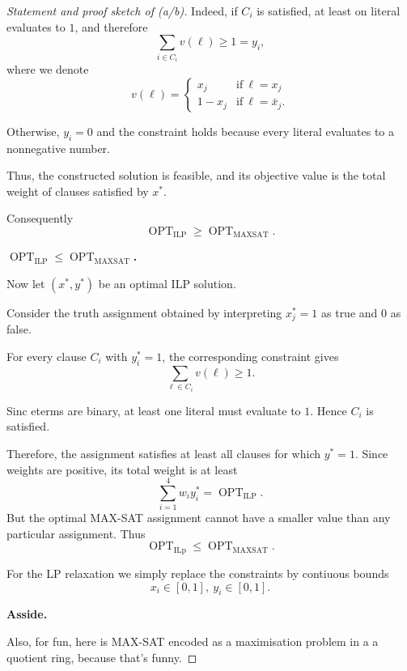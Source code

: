 \documentclass[11pt]{article}
\begin{document}
\begin{proof}[Statement and proof sketch of (a/b)]
    Indeed, if $C_i$ is satisfied, at least on 
    literal evaluates to $1$, and therefore 
    \[
        \sum_{i\in C_i}v(\ell) \geq 1 = y_i, 
    \]
    where we denote 
    \[
        v(\ell) 
        = \begin{cases}
            x_j & \text{if} \ \ell = x_j \\ 
            1 - x_j & \text{if} \ \ell = \bar x_j. 
        \end{cases}
    \]

    Otherwise, $y_i = 0$ and the constraint holds 
    because every literal evaluates to a nonnegative 
    number. 

    Thus, the constructed solution is feasible, and 
    its objective value is the total weight of clauses 
    satisfied by $x^*$. 

    Consequently 
    \[
        \operatorname{OPT}_{\text{ILP}} 
    \geq \operatorname{OPT}_{\text{MAXSAT}}. 
    \]

    \textbf{$\operatorname{OPT}_{\text{ILP}} 
    \leq \operatorname{OPT}_{\text{MAXSAT}}$.}

    Now let $(x^*, y^*)$ be an optimal ILP 
    solution. 

    Consider the truth assignment obtained by 
    interpreting $x_j^* = 1$ as true and 
    $0$ as false. 

    For every clause $C_i$ with $y^*_i = 1$, 
    the corresponding constraint gives 
    \[
        \sum_{\ell \in C_i} v(\ell) \geq 1. 
    \]

    Sinc eterms are binary, at least 
    one literal must evaluate to $1$. Hence $C_i$ is 
    satisfied. 

    Therefore, the assignment satisfies at 
    least all clauses for which $y^* = 1$. 
    Since weights are positive, its total weight is 
    at least 
    \[
        \sum_{i=1}^4 w_iy^*_i = \operatorname{OPT}_{\text{ILP}}.
    \]
    But the optimal MAX-SAT assignment cannot have 
    a smaller value than any particular assignment. Thus 
    \[
        \operatorname{OPT}_{\text{ILp}} 
        \leq 
        \operatorname{OPT}_{\text{MAXSAT}}. 
    \]  

    For the LP relaxation we simply replace the constraints 
    by contiuous bounds 
    \[
        x_i \in [0,1], \ y_i \in [0,1]. 
    \]

    \textbf{Asside.}

    Also, for fun, here is MAX-SAT encoded as a 
    maximisation problem in a  
    a quotient ring, because that's funny. 


\end{proof}
\end{document}
